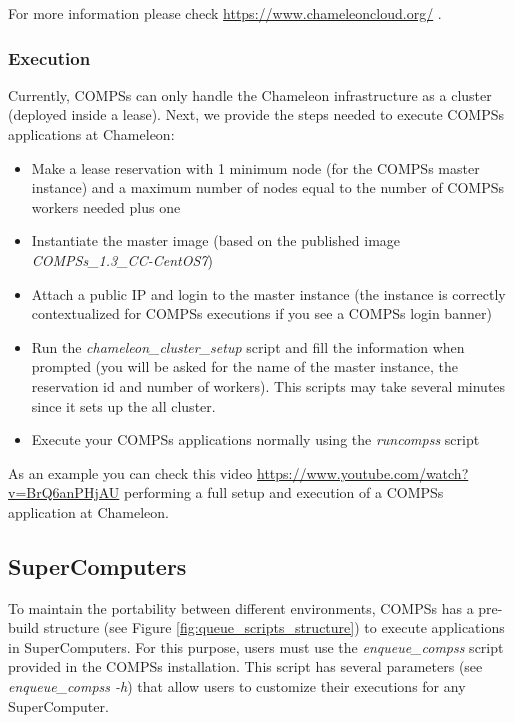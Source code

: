For more information please check \url{https://www.chameleoncloud.org/} .

\subsubsection{Execution}
Currently, COMPSs can only handle the Chameleon infrastructure as a cluster (deployed inside a lease). Next, we provide the steps
needed to execute COMPSs applications at Chameleon:

\begin{itemize}
 \item Make a lease reservation with 1 minimum node (for the COMPSs master instance) and a maximum number of nodes equal to the
 number of COMPSs workers needed plus one
 \item Instantiate the master image (based on the published image \textit{COMPSs\_1.3\_CC-CentOS7})
 \item Attach a public IP and login to the master instance (the instance is correctly contextualized for COMPSs executions if you
 see a COMPSs login banner)
 \item Run the \textit{chameleon\_cluster\_setup} script and fill the information when prompted (you will be asked for the name of the
 master instance, the reservation id and number of workers). This scripts may take several minutes since it sets up the all cluster.
 \item Execute your COMPSs applications normally using the \textit{runcompss} script
\end{itemize}

As an example you can check this video \url{https://www.youtube.com/watch?v=BrQ6anPHjAU} performing a full setup and 
execution of a COMPSs application at Chameleon.


\subsection{SuperComputers}

To maintain the portability between different environments, COMPSs has a pre-build structure (see Figure 
\ref{fig:queue_scripts_structure}) to execute applications in SuperComputers. For this purpose, users must use 
the \textit{enqueue\_compss} script provided in the COMPSs installation. This script has several parameters (see 
\textit{enqueue\_compss -h}) that allow users to customize their executions for any SuperComputer.

